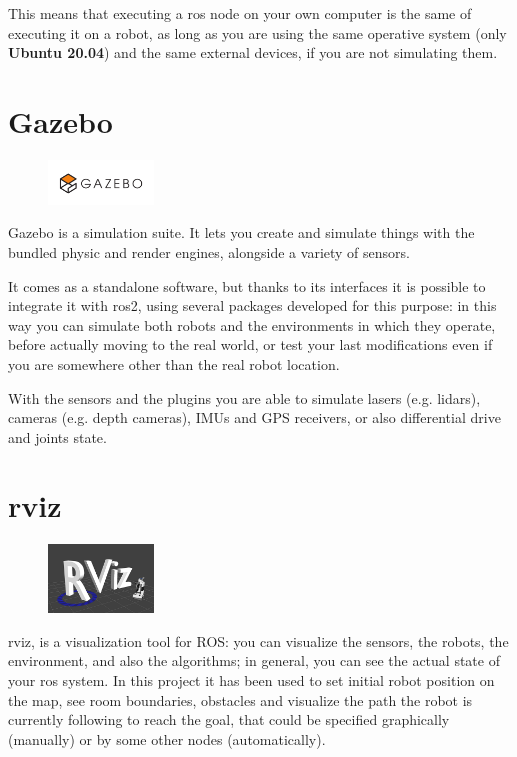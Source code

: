 This means that executing a \acrshort{ros} node on your own computer is the same of executing it on a robot, as long as you are using the same operative system (only \textbf{Ubuntu 20.04}) and the same external devices, if you are not simulating them.

\section{Gazebo}
\label{sec:gazebo}

\begin{figure}
    \includegraphics[width=0.25\textwidth]{images/gazebo}
\end{figure}

Gazebo is a simulation suite. It lets you create and simulate things with the bundled physic and render engines, alongside a variety of sensors.

It comes as a standalone software, but thanks to its interfaces it is possible to integrate it with \acrshort{ros}2, using several packages developed for this purpose: in this way you can simulate both robots and the environments in which they operate, before actually moving to the real world, or test your last modifications even if you are somewhere other than the real robot location.

With the sensors and the plugins you are able to simulate lasers (e.g. lidars), cameras (e.g. depth cameras), IMUs and GPS receivers, or also differential drive and joints state.

\section{\acrfull{rviz}}

\begin{figure}
    \includegraphics[width=0.25\textwidth]{images/rviz}
\end{figure}

\Acrshort{rviz}, is a visualization tool for ROS: you can visualize the sensors, the robots, the environment, and also the algorithms; in general, you can see the actual state of your \acrshort{ros} system. In this project it has been used to set initial robot position on the map, see room boundaries, obstacles and visualize the path the robot is currently following to reach the goal, that could be specified graphically (manually) or by some other nodes (automatically). 

